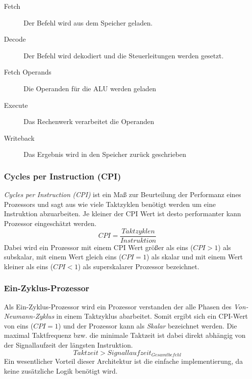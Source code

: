                 \begin{description}
                    \item[Fetch] Der Befehl wird aus dem Speicher geladen.
                    \item[Decode] Der Befehl wird dekodiert und die Steuerleitungen werden gesetzt.
                    \item[Fetch Operands] Die Operanden für die ALU werden geladen 
                    \item[Execute] Das Rechenwerk verarbeitet die Operanden
                    \item[Writeback] Das Ergebnis wird in den Speicher zurück geschrieben
                \end{description}


            \subsubsection{Cycles per Instruction (CPI)}
                \textit{Cycles per Instruction (CPI)} ist ein Maß zur Beurteilung der Performanz eines Prozessors
                und sagt aus wie viele Taktzyklen benötigt werden um eine Instruktion abzuarbeiten.
                Je kleiner der CPI Wert ist desto performanter kann Prozessor eingeschätzt werden.
                \begin{equation}
                    CPI = \frac{Taktzyklen}{Instruktion}
                \end{equation}
                Dabei wird ein Prozessor mit einem CPI Wert größer als eins ($CPI > 1$) als subskalar,
                mit einem Wert gleich eins ($CPI = 1$) als skalar und mit einem Wert kleiner als eins
                ($CPI < 1$) als superskalarer Prozessor bezeichnet.
   

            \subsubsection{Ein-Zyklus-Prozessor}
                Als Ein-Zyklus-Prozessor wird ein Prozessor verstanden der alle Phasen des \textit{Von-Neumann-Zyklus}
                in einem Taktzyklus abarbeitet.
                Somit ergibt sich ein CPI-Wert von eins ($CPI = 1$) und der Prozessor kann als \textit{Skalar} bezeichnet werden.
                Die maximal Taktfrequenz bzw. die minimale Taktzeit ist dabei direkt abhängig von der Signallaufzeit
                der längsten Instruktion.
                \begin{equation}
                    Taktzeit > Signallaufzeit_{Gesamtbefehl}
                \end{equation}
                Ein wesentlicher Vorteil dieser Architektur ist die einfache implementierung, da
                keine zusätzliche Logik benötigt wird.

